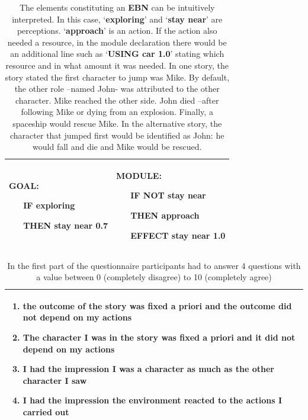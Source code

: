 \documentclass[
		twoside,openright,titlepage,numbers=noenddot,manychapters,
		headinclude,%
                footinclude=false,cleardoublepage=empty,
                BCOR=5mm,
		fontsize=11pt, %
                 enabledeprecatedfontcommands]{scrreprt}
\begin{document}
\begin{table}[]
\caption{  The elements constituting an \textbf{EBN} can be intuitively interpreted. In this case, `\textbf{exploring}' and `\textbf{stay near}' are perceptions. `\textbf{approach}' is an action. If the action also needed a resource, in the module declaration there would be an additional line such as `\textbf{USING car 1.0}' stating which resource and in what amount it was needed.
In one story, the story stated the first character to jump was Mike. By default, the other role –named John- was attributed to the other character. Mike reached the other side. John died –after following Mike or dying from an explosion. Finally, a spaceship would rescue Mike. In the alternative story, the character that jumped first would be identified as John: he would fall and die and Mike would be rescued.}
\centering
\begin{tabular*}{0.90\textwidth}{ p{}  p{} }
\\
\hline\hline
{\bf
GOAL:

\ \ \ IF exploring

 \ \ \ THEN stay near 0.7 
}
 &
{\bf
MODULE:

\ \ \ IF NOT stay near

\ \ \ THEN approach

\ \ \ EFFECT stay near 1.0 
}
 \\
[1ex]
\hline
\end{tabular*}
\label{table_modules}
\end{table}

\begin{table}[]
\caption{  In the first part of the questionnaire participants had to answer 4 questions with a value between 0 (completely disagree) to 10 (completely agree) }
\centering
\begin{tabular*}{1.0\textwidth}{ p{}  }
\\
\hline\hline
\begin{enumerate}
\item	the outcome of the story was fixed a priori and the outcome did not depend on my actions 
\item	The character I was in the story was fixed a priori and it did not depend on my actions
\item	I had the impression I was a character as much as the other character I saw
\item	I had the impression the environment reacted to the actions I carried out
\end{enumerate}

 \\[1ex]
\hline
\end{tabular*}
\label{table_q_part1}
\end{table}
\end{document}
